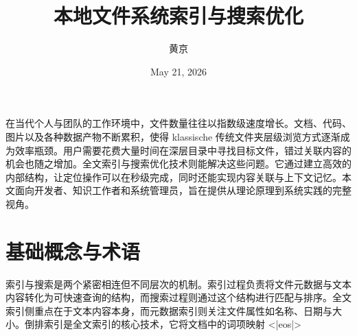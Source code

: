 \title{本地文件系统索引与搜索优化}
\author{黄京}
\date{May 21, 2026}
\maketitle
在当代个人与团队的工作环境中，文件数量往往以指数级速度增长。文档、代码、图片以及各种数据产物不断累积，使得 klassische 传统文件夹层级浏览方式逐渐成为效率瓶颈。用户需要花费大量时间在深层目录中寻找目标文件，错过关联内容的机会也随之增加。全文索引与搜索优化技术则能解决这些问题。它通过建立高效的内部结构，让定位操作可以在秒级完成，同时还能实现内容关联与上下文记忆。本文面向开发者、知识工作者和系统管理员，旨在提供从理论原理到系统实践的完整视角。\par
\chapter{基础概念与术语}
索引与搜索是两个紧密相连但不同层次的机制。索引过程负责将文件元数据与文本内容转化为可快速查询的结构，而搜索过程则通过这个结构进行匹配与排序。全文索引侧重点在于文本内容本身，而元数据索引则关注文件属性如名称、日期与大小。倒排索引是全文索引的核心技术，它将文档中的词项映射 <|eos|>\par
